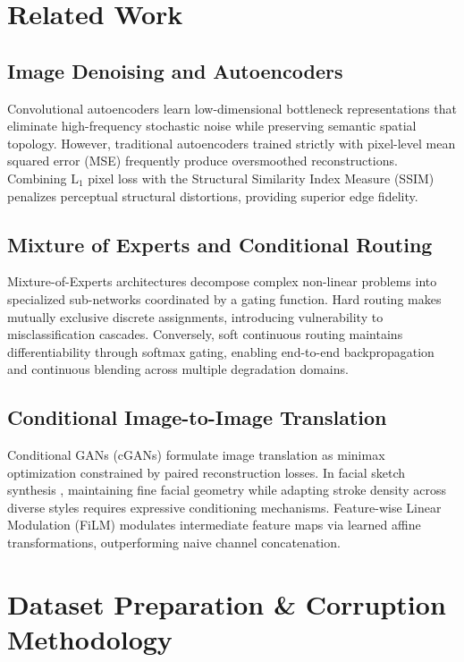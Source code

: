 \documentclass[conference]{IEEEtran}
\begin{document}
\section{Related Work}
\subsection{Image Denoising and Autoencoders}
Convolutional autoencoders learn low-dimensional bottleneck representations that eliminate high-frequency stochastic noise while preserving semantic spatial topology. However, traditional autoencoders trained strictly with pixel-level mean squared error (MSE) frequently produce oversmoothed reconstructions. Combining $\text{L}_1$ pixel loss with the Structural Similarity Index Measure (SSIM) \cite{wang2004image} penalizes perceptual structural distortions, providing superior edge fidelity.

\subsection{Mixture of Experts and Conditional Routing}
Mixture-of-Experts architectures \cite{jacobs1991adaptive, shazeer2017outrageously} decompose complex non-linear problems into specialized sub-networks coordinated by a gating function. Hard routing makes mutually exclusive discrete assignments, introducing vulnerability to misclassification cascades. Conversely, soft continuous routing maintains differentiability through softmax gating, enabling end-to-end backpropagation and continuous blending across multiple degradation domains.

\subsection{Conditional Image-to-Image Translation}
Conditional GANs (cGANs) \cite{isola2017image, goodfellow2014generative} formulate image translation as minimax optimization constrained by paired reconstruction losses. In facial sketch synthesis \cite{chen2021fs2k}, maintaining fine facial geometry while adapting stroke density across diverse styles requires expressive conditioning mechanisms. Feature-wise Linear Modulation (FiLM) \cite{perez2018film} modulates intermediate feature maps via learned affine transformations, outperforming naive channel concatenation.

\section{Dataset Preparation \& Corruption Methodology}
\end{document}
